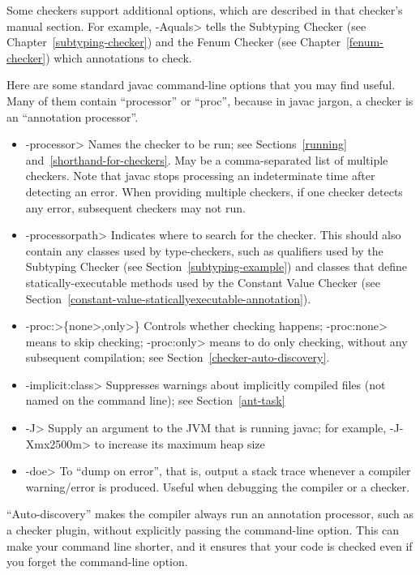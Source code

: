 \noindent
Some checkers support additional options, which are described in that
checker's manual section.
For example, \<-Aquals> tells
the Subtyping Checker (see Chapter~\ref{subtyping-checker}) and the Fenum Checker
(see Chapter~\ref{fenum-checker}) which annotations to check.


Here are some standard javac command-line options that you may find useful.
Many of them contain ``processor'' or ``proc'', because in javac jargon, a
checker is an ``annotation processor''.

\begin{itemize}
\item \<-processor> Names the checker to be
  run; see Sections~\ref{running} and~\ref{shorthand-for-checkers}.
  May be a comma-separated list of multiple checkers.  Note that javac
  stops processing an indeterminate time after detecting an error.  When
  providing multiple checkers, if one checker detects any error, subsequent
  checkers may not run.
\item \<-processorpath> Indicates where to search for the
  checker.  This should also contain any classes used by type-checkers,
  such as qualifiers used by the Subtyping Checker (see
  Section~\ref{subtyping-example}) and classes that define
  statically-executable methods used by the Constant Value Checker (see
  Section~\ref{constant-value-staticallyexecutable-annotation}).
\item \<-proc:>\{\<none>,\<only>\} Controls whether checking
  happens; \<-proc:none>
  means to skip checking; \<-proc:only> means to do only
  checking, without any subsequent compilation; see
  Section~\ref{checker-auto-discovery}.
\item \<-implicit:class> Suppresses warnings about implicitly compiled files
  (not named on the command line); see Section~\ref{ant-task}
\item \<-J> Supply an argument to the JVM that is running javac;
  for example, \<-J-Xmx2500m> to increase its maximum heap size
\item \<-doe> To ``dump on error'', that is, output a stack trace
  whenever a compiler warning/error is produced. Useful when debugging
  the compiler or a checker.
\end{itemize}



``Auto-discovery'' makes the  compiler always run an
annotation processor, such as a checker
plugin, without explicitly passing the 
command-line option.  This can make your command line shorter, and it ensures
that your code is checked even if you forget the command-line option.

